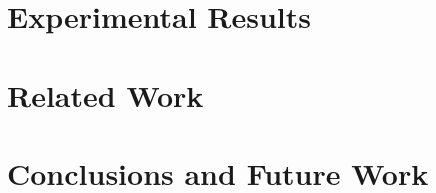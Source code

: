 \documentclass[journal]{IEEEtran}
\begin{document}
\section{Experimental Results}
\label{sec:results}


%

%

\section{Related Work}
\label{sec:related_work}


%

\section{Conclusions and Future Work}
\label{sec:conc}




\end{document}
